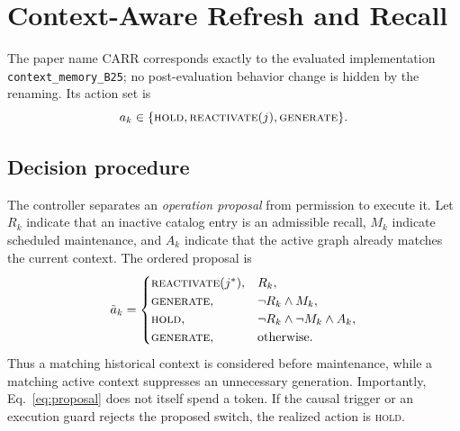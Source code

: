 \documentclass[sigconf,review,anonymous]{acmart}
\newcommand{\carr}{\textsc{CARR}\xspace}
\begin{document}
\section{Context-Aware Refresh and Recall}

The paper name \carr corresponds exactly to the evaluated implementation
\texttt{context\_memory\_B25}; no post-evaluation behavior change is hidden by
the renaming. Its action set is
\begin{equation}
 a_k\in\{\textsc{hold},\textsc{reactivate}(j),\textsc{generate}\}.
\end{equation}

\subsection{Decision procedure}

The controller separates an \emph{operation proposal} from permission to
execute it. Let $R_k$ indicate that an inactive catalog entry is an admissible
recall, $M_k$ indicate scheduled maintenance, and $A_k$ indicate that the
active graph already matches the current context. The ordered proposal is
\begin{equation}
 \tilde a_k=
 \begin{cases}
  \textsc{reactivate}(j^*), & R_k,\\
  \textsc{generate}, & \neg R_k\wedge M_k,\\
  \textsc{hold}, & \neg R_k\wedge\neg M_k\wedge A_k,\\
  \textsc{generate}, & \text{otherwise}.
 \end{cases}
 \label{eq:proposal}
\end{equation}
Thus a matching historical context is considered before maintenance, while a
matching active context suppresses an unnecessary generation. Importantly,
Eq.~\eqref{eq:proposal} does not itself spend a token. If the causal trigger or
an execution guard rejects the proposed switch, the realized action is
\textsc{hold}.
\end{document}
